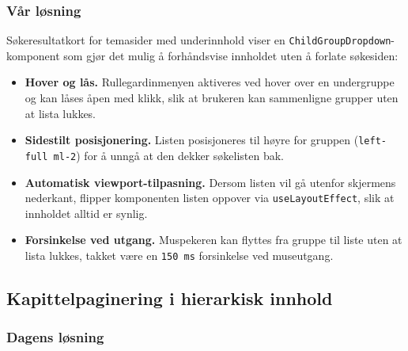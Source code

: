 \subsubsection{Vår løsning}
\label{sec:barngruppe-var}


Søkeresultatkort for temasider med underinnhold viser en
\texttt{ChildGroupDropdown}-komponent som gjør det mulig å forhåndsvise
innholdet uten å forlate søkesiden:

\begin{itemize}
    \item \textbf{Hover og lås.} Rullegardinmenyen aktiveres ved hover
          over en undergruppe og kan låses åpen med klikk, slik at
          brukeren kan sammenligne grupper uten at lista lukkes.

    \item \textbf{Sidestilt posisjonering.} Listen posisjoneres til
          høyre for gruppen (\texttt{left-full ml-2}) for å unngå at
          den dekker søkelisten bak.

    \item \textbf{Automatisk viewport-tilpasning.} Dersom listen vil
          gå utenfor skjermens nederkant, flipper komponenten listen
          oppover via \texttt{useLayoutEffect}, slik at innholdet
          alltid er synlig.

    \item \textbf{Forsinkelse ved utgang.} Muspekeren kan flyttes fra
          gruppe til liste uten at lista lukkes, takket være en
          \texttt{150\,ms} forsinkelse ved museutgang.
\end{itemize}

\subsection{Kapittelpaginering i hierarkisk innhold}
\label{sec:kapittelpaginering}

\subsubsection{Dagens løsning}
\label{sec:kapittelpaginering-idag}

